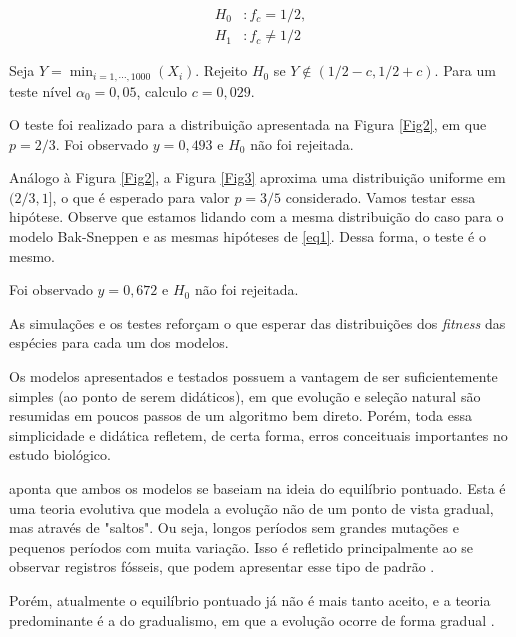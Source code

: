 \documentclass[10pt,brazil,english]{article}
\begin{document}
        \begin{equation}
            \label{eq2}
            \begin{aligned}
                H_0&: f_c = 1/2, \\
                H_1&: f_c \neq 1/2
            \end{aligned}
        \end{equation}

        Seja $Y = \min_{i = 1, \cdots, 1000}(X_i)$. Rejeito $H_0$ se $Y \notin (1/2 - c, 1/2 + c)$.
        Para um teste nível $\alpha_0 = 0,05$, calculo $c = 0,029$.

        O teste foi realizado para a distribuição apresentada na Figura \ref{Fig2}, em que $p = 2/3$.
        Foi observado $y = 0,493$ e $H_0$ não foi rejeitada.

        Análogo à Figura \ref{Fig2}, a Figura \ref{Fig3} aproxima uma distribuição uniforme em $(2/3, 1]$, o que é esperado para valor $p = 3/5$ considerado.
        Vamos testar essa hipótese.
        Observe que estamos lidando com a mesma distribuição do caso para o modelo Bak-Sneppen e as mesmas hipóteses de \ref{eq1}.
        Dessa forma, o teste é o mesmo.

        Foi observado $y = 0,672$ e $H_0$ não foi rejeitada.

        As simulações e os testes reforçam o que esperar das distribuições dos \textit{fitness} das espécies para cada um dos modelos.

        Os modelos apresentados e testados possuem a vantagem de ser suficientemente simples (ao ponto de serem didáticos), em que evolução e seleção natural são resumidas em poucos passos de um algoritmo bem direto.
        Porém, toda essa simplicidade e didática refletem, de certa forma, erros conceituais importantes no estudo biológico.

         aponta que ambos os modelos se baseiam na ideia do equilíbrio pontuado.
        Esta é uma teoria evolutiva que modela a evolução não de um ponto de vista gradual, mas através de "saltos".
        Ou seja, longos períodos sem grandes mutações e pequenos períodos com muita variação.
        Isso é refletido principalmente ao se observar registros fósseis, que podem apresentar esse tipo de padrão \cite{khouri2013estudos}.

        Porém, atualmente o equilíbrio pontuado já não é mais tanto aceito, e a teoria predominante é a do gradualismo, em que a evolução ocorre de forma gradual \cite{khouri2013estudos}.


    
    
\end{document}

